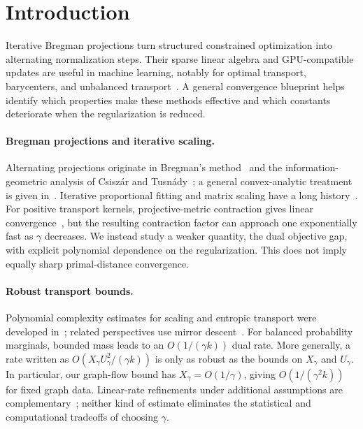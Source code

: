 \section{Introduction}
Iterative Bregman projections turn structured constrained optimization into alternating normalization steps. Their sparse linear algebra and GPU-compatible updates are useful in machine learning, notably for optimal transport, barycenters, and unbalanced transport~\citep{Cuturi13,benamou2015iterative,chizat2018scaling}. A general convergence blueprint helps identify which properties make these methods effective and which constants deteriorate when the regularization is reduced.

\paragraph{Bregman projections and iterative scaling.}
Alternating projections originate in Bregman's method~\citep{Bregman67} and the information-geometric analysis of Csisz\'ar and Tusn\'ady~\citep{CsiszarTusnady84}; a general convex-analytic treatment is given in~\citep{BauschkeBorwein1997}. Iterative proportional fitting and matrix scaling have a long history~\citep{DemingStephanIPFP,Sinkhorn64}. For positive transport kernels, projective-metric contraction gives linear convergence~\citep{FranklinLorenz89,borwein1994dad}, but the resulting contraction factor can approach one exponentially fast as $\gamma$ decreases. We instead study a weaker quantity, the dual objective gap, with explicit polynomial dependence on the regularization. This does not imply equally sharp primal-distance convergence.

\paragraph{Robust transport bounds.}
Polynomial complexity estimates for scaling and entropic transport were developed in~\citep{kalantari2008complexity,altschuler2017near,dvurechensky2018computational,chakrabarty2021sinkhornsublinearrate}; related perspectives use mirror descent~\citep{leger2021gradient,aubin2022mirror}. For balanced probability marginals, bounded mass leads to an $O(1/(\gamma k))$ dual rate. More generally, a rate written as $O(X_\gamma U_\gamma^2/(\gamma k))$ is only as robust as the bounds on $X_\gamma$ and $U_\gamma$. In particular, our graph-flow bound has $X_\gamma=O(1/\gamma)$, giving $O(1/(\gamma^2k))$ for fixed graph data. Linear-rate refinements under additional assumptions are complementary~\citep{chizat2025sharper}; neither kind of estimate eliminates the statistical and computational tradeoffs of choosing $\gamma$.

